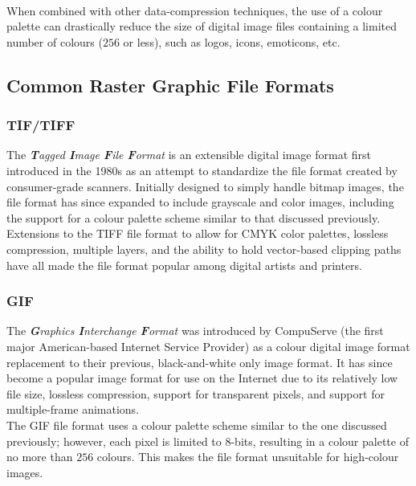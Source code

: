       \ \\[\baselineskip]
      When combined with other data-compression techniques, the use of a colour palette can drastically reduce the size of digital image files containing a limited number of colours ($256$ or less), such as logos, icons, emoticons, etc.
    \subsection{Common Raster Graphic File Formats}
      \subsubsection{TIF/TIFF}
        The \emph{\textbf{T}agged \textbf{I}mage \textbf{F}ile \textbf{F}ormat} is an extensible digital image format first introduced in the 1980s as an attempt to standardize the file format created by consumer-grade scanners. Initially designed to simply handle bitmap images, the file format has since expanded to include grayscale and color images, including the support for a colour palette scheme similar to that discussed previously.\\[\baselineskip]
        Extensions to the TIFF file format to allow for CMYK color palettes, lossless compression, multiple layers, and the ability to hold vector-based clipping paths have all made the file format popular among digital artists and printers. 
      \subsubsection{GIF}
        The \emph{\textbf{G}raphics \textbf{I}nterchange \textbf{F}ormat} was introduced by CompuServe (the first major American-based Internet Service Provider) as a colour digital image format replacement to their previous, black-and-white only image format. It has since become a popular image format for use on the Internet due to its relatively low file size, lossless compression, support for transparent pixels, and support for multiple-frame animations.\\[\baselineskip]
        The GIF file format uses a colour palette scheme similar to the one discussed previously; however, each pixel is limited to 8-bits, resulting in a colour palette of no more than $256$ colours. This makes the file format unsuitable for high-colour images.
